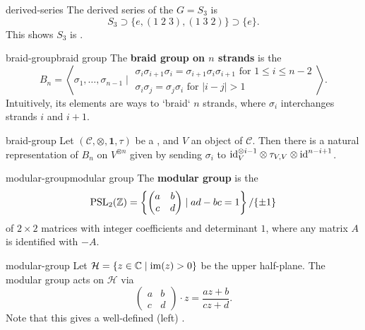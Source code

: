 \begin{example}{derived-series}
    The derived series of the  $G = S_3$ is
    \[ S_3 \supset \{ e, (1 \; 2 \; 3), (1 \; 3 \; 2) \} \supset \{ e \} . \]
    This shows $S_3$ is .
\end{example}

\begin{topic}{braid-group}{braid group}
    The \textbf{braid group on $n$ strands} is the 
    \[ B_n = \left\langle \sigma_1, \ldots, \sigma_{n - 1} \;\bigg|\; \begin{array}{cc} \sigma_i \sigma_{i + 1} \sigma_i = \sigma_{i + 1} \sigma_i \sigma_{i + 1} \text{ for } 1 \le i \le n - 2 \\ \sigma_i \sigma_j = \sigma_j \sigma_i \text{ for } |i - j| > 1 \end{array} \right\rangle . \]
    Intuitively, its elements are ways to `braid` $n$ strands, where $\sigma_i$ interchanges strands $i$ and $i + 1$.
\end{topic}

\begin{example}{braid-group}
    Let $(\mathcal{C}, \otimes, \textbf{1}, \tau)$ be a , and $V$ an object of $\mathcal{C}$. Then there is a natural representation of $B_n$ on $V^{\otimes n}$ given by sending $\sigma_i$ to $\textup{id}_V^{\otimes i - 1} \otimes \tau_{V, V} \otimes \textup{id}^{n - i + 1}$.
\end{example}

\begin{topic}{modular-group}{modular group}
    The \textbf{modular group} is the 
    \[ \textup{PSL}_2(\mathbb{Z}) = \left\{ \begin{pmatrix} a & b \\ c & d \end{pmatrix} \mid ad - bc = 1 \right\} / \{ \pm 1 \} \]
    of $2 \times 2$ matrices with integer coefficients and determinant $1$, where any matrix $A$ is identified with $-A$.
\end{topic}

\begin{example}{modular-group}
    Let $\mathcal{H} = \{ z \in \mathbb{C} \mid \operatorname{im}(z) > 0 \}$ be the upper half-plane. The modular group acts on $\mathcal{H}$ via
    \[ \begin{pmatrix} a & b \\ c & d \end{pmatrix} \cdot z = \frac{az + b}{cz + d} . \]
    Note that this gives a well-defined (left) .
\end{example}

